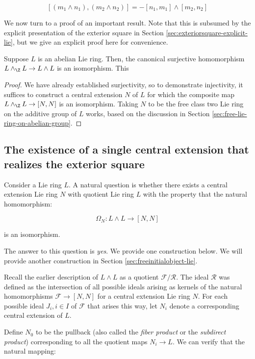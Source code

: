 \documentclass{ucetd}
\begin{document}
$$[(m_1 \wedge n_1),(m_2 \wedge n_2)] = -[n_1,m_1] \wedge [m_2,n_2]$$

We now turn to a proof of an important result. Note that this is
subsumed by the explicit presentation of the exterior square in
Section \ref{sec:exteriorsquare-explicit-lie}, but we give an explicit
proof here for convenience.

\begin{lemma}\label{lemma:exteriorsquare-of-abelian-group}
  Suppose $L$ is an abelian Lie ring. Then, the canonical surjective
  homomorphism $L \wedge_\Z L \to L \wedge L$ is an isomorphism. This
\end{lemma}

\begin{proof}
  We have already established surjectivity, so to demonstrate
  injectivity, it suffices to construct a central extension $N$ of $L$
  for which the composite map $L \wedge_\Z L \to [N,N]$ is an
  isomorphism. Taking $N$ to be the free class two Lie ring on the
  additive group of $L$ works, based on the discussion in Section
  \ref{sec:free-lie-ring-on-abelian-group}.
\end{proof}

\subsection{The existence of a single central extension that realizes the exterior square}\label{sec:grandcentralproduct-lie}

Consider a Lie ring $L$. A natural question is whether there exists a
central extension Lie ring $N$ with quotient Lie ring $L$ with the
property that the natural homomorphism:

$$\Omega_N: L \wedge L \to [N,N]$$

is an isomorphism.

The answer to this question is {\em yes}. We provide one construction
below. We will provide another construction in
Section \ref{sec:freeinitialobject-lie}.

Recall the earlier description of $L \wedge L$ as a quotient
$\mathcal{F}/\mathcal{R}$. The ideal $\mathcal{R}$ was
defined as the intersection of all possible ideals arising
as kernels of the natural homomorphisms $\mathcal{F} \to [N,N]$ for a
central extension Lie ring $N$. For each possible ideal $J_i, i
\in I$ of $\mathcal{F}$ that arises this way, let $N_i$ denote a
corresponding central extension of $L$.

Define $N_0$ to be the pullback (also called the {\em fiber product}
or the {\em subdirect product}) corresponding to all the quotient maps
$N_i \to L$. We can verify that the natural mapping:
\end{document}
